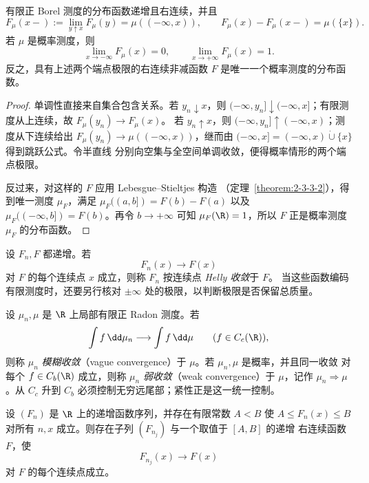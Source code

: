 \begin{proposition}[分布函数的刻画]\label{proposition:7-3-2-distribution-functions}
有限正 Borel 测度的分布函数递增且右连续，并且
\[
 F_\mu(x-):=\lim_{y\uparrow x}F_\mu(y)=\mu(( -\infty,x)),
 \qquad
 F_\mu(x)-F_\mu(x-)=\mu(\{x\}).
\]
若 $\mu$ 是概率测度，则
\[
 \lim_{x\to-\infty}F_\mu(x)=0,
 \qquad
 \lim_{x\to+\infty}F_\mu(x)=1.
\]
反之，具有上述两个端点极限的右连续非减函数 $F$ 是唯一一个概率测度的分布函数。
\end{proposition}

\begin{proof}
单调性直接来自集合包含关系。若 $y_n\downarrow x$，则
$(-\infty,y_n]\downarrow(-\infty,x]$；有限测度从上连续，故 $F_\mu(y_n)\to F_\mu(x)$。
若 $y_n\uparrow x$，则
$(-\infty,y_n]\uparrow(-\infty,x)$；测度从下连续给出
$F_\mu(y_n)\to\mu((-\infty,x))$，继而由
$(-\infty,x]=(-\infty,x)\mathbin{\dot\cup}\{x\}$ 得到跳跃公式。令半直线
分别向空集与全空间单调收敛，便得概率情形的两个端点极限。

反过来，对这样的 $F$ 应用 Lebesgue--Stieltjes 构造
（定理~\ref{theorem:2-3-3-2}），得到唯一测度 $\mu_F$，满足
$\mu_F((a,b])=F(b)-F(a)$ 以及 $\mu_F(( -\infty,b])=F(b)$。再令 $b\to+\infty$ 可知
$\mu_F(\R)=1$，所以 $F$ 正是概率测度 $\mu_F$ 的分布函数。
\end{proof}

\begin{definition}[Helly 收敛]\label{def:7-3-2-2}
设 $F_n,F$ 都递增。若
\[
 F_n(x)\longrightarrow F(x)
\]
对 $F$ 的每个连续点 $x$ 成立，则称 $F_n$ 按连续点 \emph{Helly 收敛}于 $F$。
当这些函数编码有限测度时，还要另行核对 $\pm\infty$ 处的极限，以判断极限是否保留总质量。
\end{definition}

\begin{definition}[模糊收敛与弱收敛]\label{def:7-3-2-3}
设 $\mu_n,\mu$ 是 $\R$ 上局部有限正 Radon 测度。若
\[
 \int f\,\dd\mu_n\longrightarrow\int f\,\dd\mu
 \qquad(f\in C_c(\R)),
\]
则称 $\mu_n$ \emph{模糊收敛}（vague convergence）于 $\mu$。若 $\mu_n,\mu$ 是概率，并且同一收敛
对每个 $f\in C_b(\R)$ 成立，则称 $\mu_n$ \emph{弱收敛}（weak convergence）于 $\mu$，记作
$\mu_n\Rightarrow\mu$。从 $C_c$ 升到 $C_b$ 必须控制无穷远尾部；紧性正是这一统一控制。
\end{definition}

\begin{theorem}\label{theorem:7-3-2-1}
设 $(F_n)$ 是 $\R$ 上的递增函数序列，并存在有限常数 $A<B$ 使
$A\leq F_n(x)\leq B$ 对所有 $n,x$ 成立。则存在子列 $(F_{n_j})$ 与一个取值于 $[A,B]$ 的递增
右连续函数 $F$，使
\[
 F_{n_j}(x)\longrightarrow F(x)
\]
对 $F$ 的每个连续点成立。
\end{theorem}

